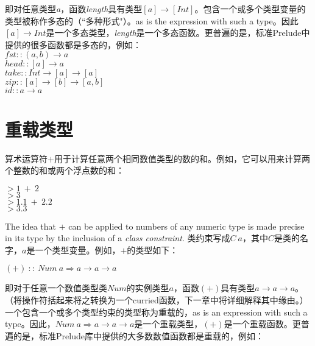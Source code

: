 即对任意类型\textit{a}，函数\textit{length}具有类型$[a]
\rightarrow [Int]$。包含一个或多个类型变量的类型被称作多态的（“多种形式"）。as
is the expression with such a type。因此$[a] \rightarrow
Int$是一个多态类型，\textit{length}是一个多态函数。更普遍的是，标准Prelude中提供的很多函数都是多态的，例如：\\
\hspace*{1cm} $fst :: (a, b) \rightarrow a$\\
\hspace*{1cm} $head :: [a] \rightarrow a$\\
\hspace*{1cm} $take :: Int \rightarrow [a] \rightarrow [a]$\\
\hspace*{1cm} $zip :: [a] \rightarrow [b] \rightarrow [a, b]$\\
\hspace*{1cm} $id :: a \rightarrow a$

\section{重载类型}

算术运算符$+$用于计算任意两个相同数值类型的数的和。例如，它可以用来计算两个整数的和或两个浮点数的和：

\noindent\hspace*{1cm} $> 1~+~2$\\
\hspace*{1cm} $> 3$\\

\noindent\hspace*{1cm} $> 1.1~+~2.2$\\
\hspace*{1cm} $> 3.3$

The idea that $+$ can be applied to numbers of any numeric type is made precise in its type by the inclusion of a \textit{class constraint}.  类约束写成$C~a$，其中$C$是类的名字，$a$是一个类型变量。例如，$+$的类型如下： 

\noindent\hspace*{1cm} $(+)~::~Num~a \Rightarrow  a \rightarrow a \rightarrow a$

即对于任意一个数值类型类$Num$的实例类型$a$，函数$(+)$具有类型$a \rightarrow a
\rightarrow a$。（将操作符括起来将之转换为一个curried函数，下一章中将详细解释其中缘由。）一个包含一个或多个类型约束的类型称为重载的，as
is an expression with such a type。因此，$Num~a \Rightarrow  a \rightarrow a
\rightarrow
a$是一个重载类型，$(+)$是一个重载函数。更普遍的是，标准Prelude库中提供的大多数数值函数都是重载的，例如：

